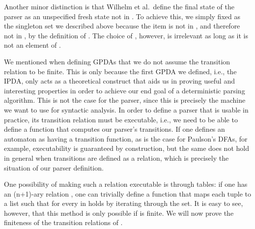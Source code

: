 \begin{isabellebody}
\begin{isamarkuptext}
Another minor distinction is that Wilhelm et al.\ define the final state of the parser as an 
unspecified fresh state not in . To achieve this, we simply fixed  as the singleton set we 
described above because the item  is not in , and therefore not in , 
by the definition of . The choice of , however, is irrelevant as long as it is not an element
of .%
\end{isamarkuptext}\isamarkuptrue%
%
\isadelimdocument
%
\endisadelimdocument
%
\isatagdocument
%
\isamarkuptrue%
%
\endisatagdocument
{\isafolddocument}%
%
\isadelimdocument
%
\endisadelimdocument
%
\begin{isamarkuptext}%
We mentioned when defining GPDAs that we do not assume the transition relation to be finite.
This is only because the first GPDA we defined, i.e., the IPDA, only acts as a theoretical construct 
that aids us in proving useful and interesting properties in order to achieve our end goal of a
deterministic parsing algorithm. This is not the case for the  parser, since this is precisely
the machine we want to use for syntactic analysis. In order to define a parser that is usable
in practice, its transition relation must be executable, i.e., we need to be able to define a
function that computes our parser's transitions. If one defines an automaton as having a transition function,
as is the case for Paulson's DFAs, for example, executability is guaranteed by construction, but the
same does not hold in general when transitions are defined as a relation, which is precisely the
situation of our parser definition.

One possibility of making such a relation executable is through tables: if one has an (n+1)-ary
relation , one can trivially define a function that maps each tuple  to a list
 such that for every  in  holds  by iterating through the
set. It is easy to see, however, that this method is only possible if  is finite. We will now
prove the finiteness of the transition relations of .


\end{isamarkuptext}
\end{isabellebody}
